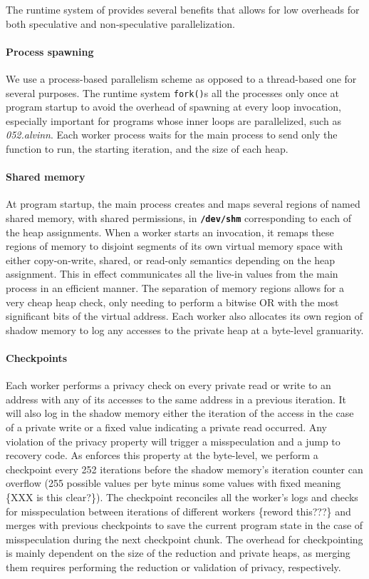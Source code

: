 The runtime system of \name provides several benefits that allows for
low overheads for both speculative and non-speculative parallelization.

\paragraph{Process spawning}
We use a process-based parallelism scheme as opposed to a thread-based one
for several purposes. The runtime system \texttt{fork()}s all the processes
only once at program startup to avoid the overhead of spawning at every loop
invocation, especially important for programs whose inner loops are
parallelized, such as \textit{052.alvinn}. Each worker process waits for the main
process to send only the function to run, the starting iteration, and the
size of each heap.

\paragraph{Shared memory}
At program startup, the main process creates and maps several regions of named shared
memory, with shared permissions, in \texttt{\textbf{/dev/shm}} corresponding
to each of the heap assignments.
When a worker starts an invocation, it remaps these regions of memory to
disjoint segments of its own virtual memory space with either
copy-on-write, shared, or read-only semantics depending on the heap
assignment. This in effect communicates all the live-in values from the
main process in an efficient manner. The separation of memory regions
allows for a very cheap heap check, only needing to perform a bitwise OR
with the most significant bits of the virtual address.
Each worker also allocates its own
region of shadow memory to log any accesses to the private heap at a
byte-level granuarity.

\paragraph{Checkpoints}
Each worker performs a privacy check on every private read or write to an
address with any of its accesses to the same address in a previous
iteration. It will also log in the shadow memory either the iteration of the
access in the case of a private write or a fixed value indicating a
private read occurred. Any violation of the privacy property will trigger a
misspeculation and a jump to recovery code. As \name enforces this
property at the byte-level, we perform a checkpoint every 252 iterations
before the shadow memory's iteration counter can overflow (255 possible
values per byte minus some values with fixed meaning \{XXX is this
clear?\}). The checkpoint reconciles all the worker's logs and checks for
misspeculation between iterations of different workers \{reword this???\} and
merges with previous checkpoints to save the current program state in the
case of misspeculation during the next checkpoint chunk. The overhead for
checkpointing is mainly dependent on the size of the reduction and private heaps,
as merging them requires performing the reduction or validation of privacy,
respectively.

